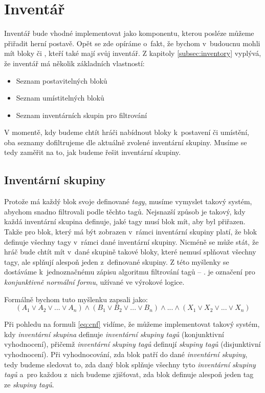 
\section{Inventář}

Inventář bude vhodné implementovat jako komponentu, kterou posléze můžeme přiřadit herní postavě. Opět se zde opíráme o~fakt, že bychom v~budoucnu mohli mít bloky či \NPC{}, kteří také mají svůj inventář. Z kapitoly \ref{subsec:inventory} vyplývá, že inventář má několik základních vlastností:

\begin{itemize}
	\item Seznam postavitelných bloků
	\item Seznam umístitelných bloků
	\item Seznam inventárních skupin pro filtrování
\end{itemize}

V momentě, kdy budeme chtít hráči nabídnout bloky k~postavení či umístění, oba seznamy dofiltrujeme dle aktuálně zvolené inventární skupiny. Musíme se tedy zaměřit na to, jak budeme řešit inventární skupiny.

\subsection{Inventární skupiny}

Protože má každý blok svoje definované \textit{tagy}, musíme vymyslet takový systém, abychom snadno filtrovali podle těchto tagů. Nejsnazší způsob je takový, kdy každá inventární skupina definuje, jaké tagy musí blok mít, aby byl přiřazen. Takže pro blok, který má být zobrazen v~rámci inventární skupiny platí, že blok definuje všechny tagy v~rámci dané inventární skupiny. Nicméně se může stát, že hráč bude chtít mít v~dané skupině takové bloky, které nemusí splňovat všechny tagy, ale splňují alespoň jeden z~definované skupiny. Z této myšlenky se dostáváme k~jednoznačnému zápisu algoritmu filtrování tagů -- \CNF{}. \CNF{} je označení pro \textit{konjunktivně normální formu}, užívané ve výrokové logice.

Formálně bychom tuto myšlenku zapsali jako:
\begin{equation}\label{eq:cnf}
	( A_1 \lor A_2 \lor ... \lor A_n )  \land ( B_1 \lor B_2 \lor ... \lor B_n ) \land ... \land ( X_1 \lor X_2 \lor ... \lor X_n )  
\end{equation}


Při pohledu na formuli \ref{eq:cnf} vidíme, že můžeme implementovat takový systém, kdy \textit{inventární skupina} definuje \textit{inventární skupiny tagů} (konjunktivní vyhodnocení), přičemž \textit{inventární skupiny tagů} definují \textit{skupiny tagů} (disjunktivní vyhodnocení). Při vyhodnocování, zda blok patří do dané \textit{inventární skupiny}, tedy budeme sledovat to, zda daný blok splňuje všechny tyto \textit{inventární skupiny tagů} a~pro každou z~nich budeme zjišťovat, zda blok definuje alespoň jeden tag ze \textit{skupiny tagů}. 

